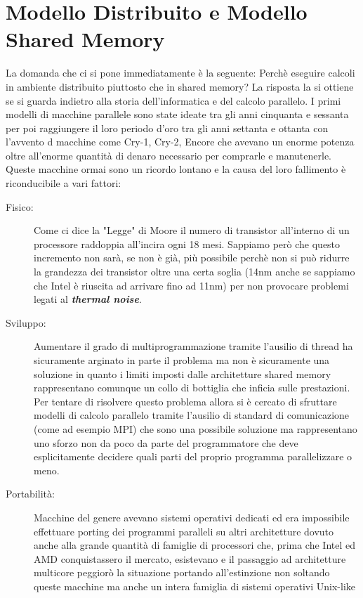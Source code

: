 \section{Modello Distribuito e Modello Shared Memory}
La domanda che ci si pone immediatamente è la seguente: Perchè eseguire calcoli in ambiente distribuito piuttosto che in shared memory? La risposta la si ottiene se si guarda indietro alla storia dell'informatica e del calcolo parallelo. I primi modelli di macchine parallele sono state ideate tra gli anni cinquanta e sessanta per poi raggiungere il loro periodo d'oro tra gli anni settanta e ottanta con l'avvento d macchine come Cry-1, Cry-2, Encore che avevano un enorme potenza oltre all'enorme quantità di denaro necessario per comprarle e manutenerle. Queste macchine ormai sono un ricordo lontano e la causa del loro fallimento è riconducibile a vari fattori:
\begin{description}
    \item [Fisico:] Come ci dice la "Legge" di Moore il numero di transistor all'interno di un processore raddoppia all'incira ogni 18 mesi. Sappiamo però che questo incremento non sarà, se non è già, più possibile perchè non si può ridurre la grandezza dei transistor oltre una certa soglia (14nm anche se sappiamo che Intel è riuscita ad arrivare fino ad 11nm) per non provocare problemi legati al \textbf{\textit{thermal noise}}. 
    \item [Sviluppo:] Aumentare il grado di multiprogrammazione tramite l'ausilio di thread ha sicuramente arginato in parte il problema ma non è sicuramente una soluzione in quanto i limiti imposti dalle architetture shared memory rappresentano comunque un collo di bottiglia che inficia sulle prestazioni. Per tentare di risolvere questo problema allora si è cercato di sfruttare modelli di calcolo parallelo tramite l'ausilio di standard di comunicazione (come ad esempio MPI) che sono una possibile soluzione ma rappresentano uno sforzo non da poco da parte del programmatore che deve esplicitamente decidere quali parti del proprio programma parallelizzare o meno.
    \item[Portabilità:] Macchine del genere avevano sistemi operativi dedicati ed era impossibile effettuare porting dei programmi paralleli su altri architetture dovuto anche alla grande quantità di famiglie di processori che, prima che Intel ed AMD conquistassero il mercato, esistevano e il passaggio ad architetture multicore peggiorò la situazione portando all'estinzione non soltando queste macchine ma anche un intera famiglia di sistemi operativi Unix-like
  \end{description}
